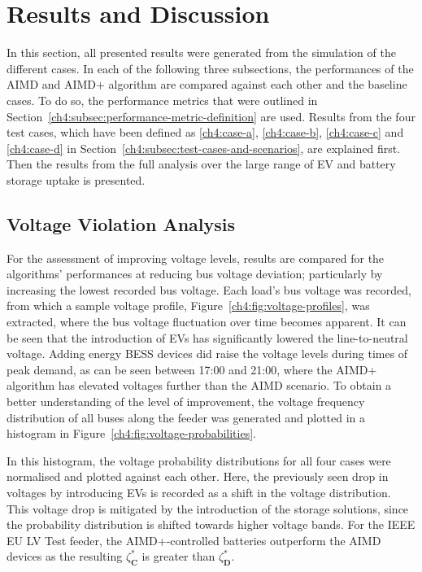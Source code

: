 \section{Results and Discussion}
\label{ch4:sec:results-and-discussion}

In this section, all presented results were generated from the simulation of the different cases.
In each of the following three subsections, the performances of the AIMD and AIMD+ algorithm are compared against each other and the baseline cases.
To do so, the performance metrics that were outlined in Section~\ref{ch4:subsec:performance-metric-definition} are used.
Results from the four test cases, which have been defined as \ref{ch4:case-a}, \ref{ch4:case-b}, \ref{ch4:case-c} and \ref{ch4:case-d} in Section~\ref{ch4:subsec:test-cases-and-scenarios}, are explained first.
Then the results from the full analysis over the large range of EV and battery storage uptake is presented.

\subsection{Voltage Violation Analysis}



For the assessment of improving voltage levels, results are compared for the algorithms' performances at reducing bus voltage deviation; particularly by increasing the lowest recorded bus voltage.
Each load's bus voltage was recorded, from which a sample voltage profile, Figure~\ref{ch4:fig:voltage-profiles}, was extracted, where the bus voltage fluctuation over time becomes apparent. It can be seen that the introduction of EVs has significantly lowered the line-to-neutral voltage. Adding energy BESS devices did raise the voltage levels during times of peak demand, as can be seen between 17:00 and 21:00, where the AIMD+ algorithm has elevated voltages further than the AIMD scenario. To obtain a better understanding of the level of improvement, the voltage frequency distribution of all buses along the feeder was generated and plotted in a histogram in Figure~\ref{ch4:fig:voltage-probabilities}.



In this histogram, the voltage probability distributions for all four cases were normalised and plotted against each other.
Here, the previously seen drop in voltages by introducing EVs is recorded as a shift in the voltage distribution.
This voltage drop is mitigated by the introduction of the storage solutions, since the probability distribution is shifted towards higher voltage bands.
For the IEEE EU LV Test feeder, the AIMD+-controlled batteries outperform the AIMD devices as the resulting $\zeta_\textbf{C}^{*}$ is greater than $\zeta_\textbf{D}^{*}$.

